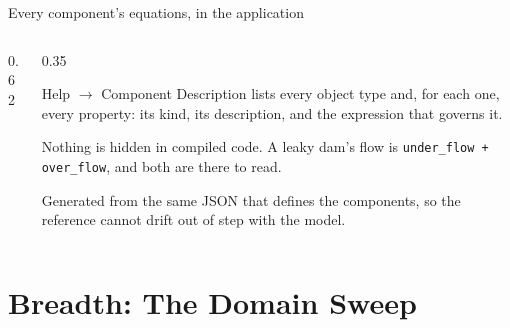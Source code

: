 \documentclass[aspectratio=169, 10pt]{beamer}
\begin{document}
\begin{frame}{Every component's equations, in the application}
  \begin{columns}[c,onlytextwidth]
    \begin{column}{0.62\textwidth}
    \end{column}
    \begin{column}{0.35\textwidth}
      {\footnotesize \alert{Help $\rightarrow$ Component Description} lists
      every object type and, for each one, every property: its kind, its
      description, and \alert{the expression that governs it}.

      \vspace{0.6em}
      Nothing is hidden in compiled code. A leaky dam's flow is
      \texttt{under\_flow + over\_flow}, and both are there to read.}
      \vspace{0.6em}

      {\scriptsize Generated from the same JSON that defines the components, so
      the reference cannot drift out of step with the model.}
    \end{column}
  \end{columns}
\end{frame}

\section{Breadth: The Domain Sweep}
\end{document}
